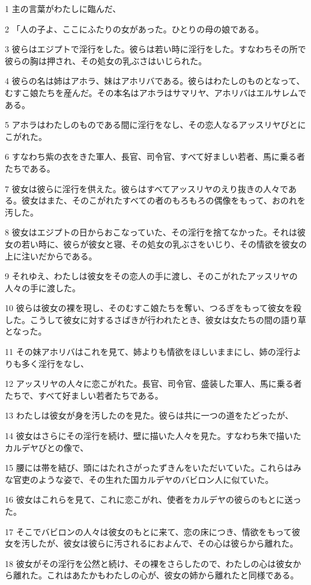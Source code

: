 \par 1 主の言葉がわたしに臨んだ、
\par 2 「人の子よ、ここにふたりの女があった。ひとりの母の娘である。
\par 3 彼らはエジプトで淫行をした。彼らは若い時に淫行をした。すなわちその所で彼らの胸は押され、その処女の乳ぶさはいじられた。
\par 4 彼らの名は姉はアホラ、妹はアホリバである。彼らはわたしのものとなって、むすこ娘たちを産んだ。その本名はアホラはサマリヤ、アホリバはエルサレムである。
\par 5 アホラはわたしのものである間に淫行をなし、その恋人なるアッスリヤびとにこがれた。
\par 6 すなわち紫の衣をきた軍人、長官、司令官、すべて好ましい若者、馬に乗る者たちである。
\par 7 彼女は彼らに淫行を供えた。彼らはすべてアッスリヤのえり抜きの人々である。彼女はまた、そのこがれたすべての者のもろもろの偶像をもって、おのれを汚した。
\par 8 彼女はエジプトの日からおこなっていた、その淫行を捨てなかった。それは彼女の若い時に、彼らが彼女と寝、その処女の乳ぶさをいじり、その情欲を彼女の上に注いだからである。
\par 9 それゆえ、わたしは彼女をその恋人の手に渡し、そのこがれたアッスリヤの人々の手に渡した。
\par 10 彼らは彼女の裸を現し、そのむすこ娘たちを奪い、つるぎをもって彼女を殺した。こうして彼女に対するさばきが行われたとき、彼女は女たちの間の語り草となった。
\par 11 その妹アホリバはこれを見て、姉よりも情欲をほしいままにし、姉の淫行よりも多く淫行をなし、
\par 12 アッスリヤの人々に恋こがれた。長官、司令官、盛装した軍人、馬に乗る者たちで、すべて好ましい若者たちである。
\par 13 わたしは彼女が身を汚したのを見た。彼らは共に一つの道をたどったが、
\par 14 彼女はさらにその淫行を続け、壁に描いた人々を見た。すなわち朱で描いたカルデヤびとの像で、
\par 15 腰には帯を結び、頭にはたれさがったずきんをいただいていた。これらはみな官吏のような姿で、その生れた国カルデヤのバビロン人に似ていた。
\par 16 彼女はこれらを見て、これに恋こがれ、使者をカルデヤの彼らのもとに送った。
\par 17 そこでバビロンの人々は彼女のもとに来て、恋の床につき、情欲をもって彼女を汚したが、彼女は彼らに汚されるにおよんで、その心は彼らから離れた。
\par 18 彼女がその淫行を公然と続け、その裸をさらしたので、わたしの心は彼女から離れた。これはあたかもわたしの心が、彼女の姉から離れたと同様である。
